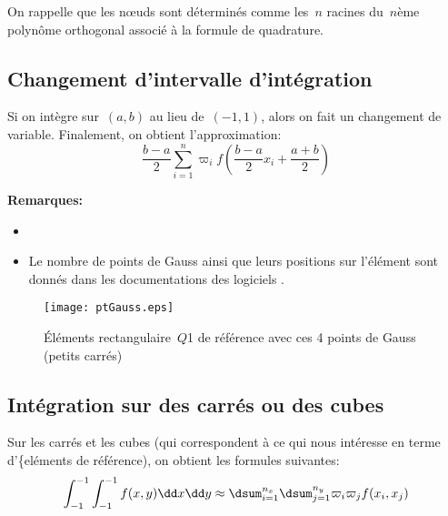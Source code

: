 On rappelle que les nœuds sont déterminés comme les~$n$ racines du~$n$ème 
polynôme orthogonal associé à la formule de quadrature.

\medskip
{}

\medskip
\subsection*{Changement d'intervalle d'intégration}

Si on intègre sur~$(a,b)$ au lieu de~$(-1,1)$, alors on fait un changement de
variable.
Finalement, on obtient l'approximation:
\begin{equation}  \frac{b-a}{2} \sum_{i=1}^n \varpi_i f\left(\frac{b-a}{2}x_i + \frac{a+b}{2}\right) \end{equation}

\medskip
\textbf{Remarques:}
\begin{itemize}
\item {}
\item Le nombre de points de Gauss ainsi que leurs positions sur l'élément sont donnés dans 
les documentations des logiciels .
\end{itemize}

\begin{figure}[ht]
\begin{center}
\texttt{[image: ptGauss.eps]}
\end{center}
\caption{\label{ptGauss} Éléments rectangulaire~$Q$1 de référence avec ces 4 points de Gauss (petits carrés)}
\end{figure}

\medskip
\subsection*{Intégration sur des carrés ou des cubes}

Sur les carrés et les cubes (qui correspondent à ce qui nous intéresse en terme
d'\{eléments de référence), on obtient les formules suivantes:
\begin{equation} \int_{-1}^{-1}\int_{-1}^{-1} f(x,y)\dd x\dd y \approx
\dsum_{i=1}^{n_x}\dsum_{j=1}^{n_y} \varpi_i\varpi_j f(x_i,x_j)\end{equation}

